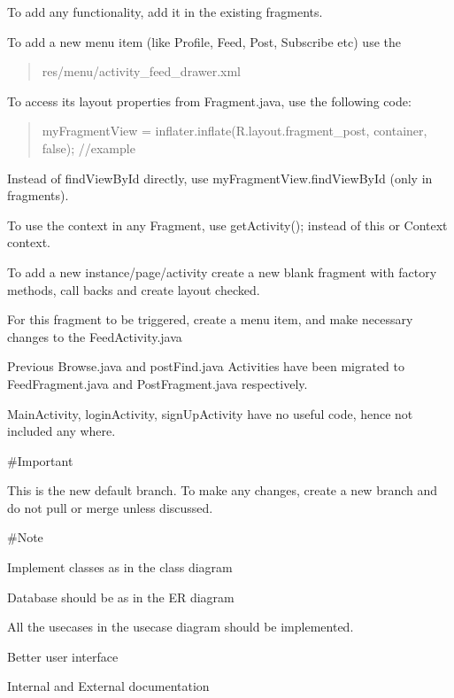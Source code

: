 To add any functionality, add it in the existing fragments.

To add a new menu item (like Profile, Feed, Post, Subscribe etc) use the \begin{quote}
res/menu/activity\+\_\+feed\+\_\+drawer.\+xml \end{quote}


To access its layout properties from Fragment.\+java, use the following code\+: \begin{quote}
my\+Fragment\+View = inflater.\+inflate(R.\+layout.\+fragment\+\_\+post, container, false); //example \end{quote}


Instead of find\+View\+By\+Id directly, use my\+Fragment\+View.\+find\+View\+By\+Id (only in fragments).

To use the context in any Fragment, use get\+Activity(); instead of this or Context context.

To add a new instance/page/activity create a new blank fragment with factory methods, call backs and create layout checked.
\begin{DoxyItemize}
\item For this fragment to be triggered, create a menu item, and make necessary changes to the Feed\+Activity.\+java
\end{DoxyItemize}

Previous Browse.\+java and post\+Find.\+java Activities have been migrated to Feed\+Fragment.\+java and Post\+Fragment.\+java respectively.

Main\+Activity, login\+Activity, sign\+Up\+Activity have no useful code, hence not included any where.

\#\+Important

This is the new default branch. To make any changes, create a new branch and do not pull or merge unless discussed.

\#\+Note
\begin{DoxyEnumerate}
\item Implement classes as in the class diagram
\item Database should be as in the ER diagram
\item All the usecases in the usecase diagram should be implemented.
\item Better user interface
\item Internal and External documentation 
\end{DoxyEnumerate}